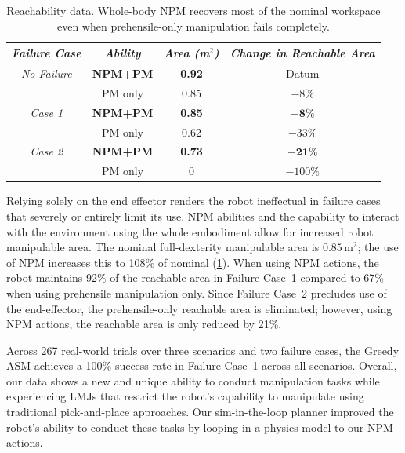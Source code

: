\begin{table}[h]
\centering
\begin{tabular}{@{}cccc@{}}
\toprule
\textit{\textbf{Failure Case}} & \textit{\textbf{Ability}} & \textit{\textbf{Area (m$^2$)}} & \textit{\textbf{Change in Reachable Area}}\\ \midrule
\textit{No Failure} & \textbf{NPM+PM} & \textbf{0.92} & Datum \\
                    & PM only & 0.85 & $-8\%$ \\ \midrule
\textit{Case 1}     & \textbf{NPM+PM} & \textbf{0.85} & $\mathbf{-8\%}$ \\
                    & PM only & 0.62 & $-33\%$ \\ \midrule
\textit{Case 2}     & \textbf{NPM+PM} & \textbf{0.73} & $\mathbf{-21\%}$ \\
                    & PM only & 0 & $-100\%$ \\ \bottomrule
\end{tabular}
\caption[Workspace reachability under joint failure with whole-body NPM recovery.]{Reachability data. Whole-body NPM recovers most of the nominal workspace even when prehensile-only manipulation fails completely.}
\label{tab:constrained:reach}
\end{table}

Relying solely on the end effector renders the robot ineffectual in failure cases that severely or entirely limit its use.
NPM abilities and the capability to interact with the environment using the whole embodiment allow for increased robot manipulable area.
The nominal full-dexterity manipulable area is $0.85\,\text{m}^2$; the use of NPM increases this to 108\% of nominal (\cref{tab:constrained:reach}).
When using NPM actions, the robot maintains 92\% of the reachable area in Failure Case~1 compared to 67\% when using prehensile manipulation only.
Since Failure Case~2 precludes use of the end-effector, the prehensile-only reachable area is eliminated; however, using NPM actions, the reachable area is only reduced by 21\%.

Across 267 real-world trials over three scenarios and two failure cases, the Greedy ASM achieves a 100\% success rate in Failure Case~1 across all scenarios.
Overall, our data shows a new and unique ability to conduct manipulation tasks while experiencing LMJs that restrict the robot's capability to manipulate using traditional pick-and-place approaches.
Our sim-in-the-loop planner improved the robot's ability to conduct these tasks by looping in a physics model to our NPM actions.

